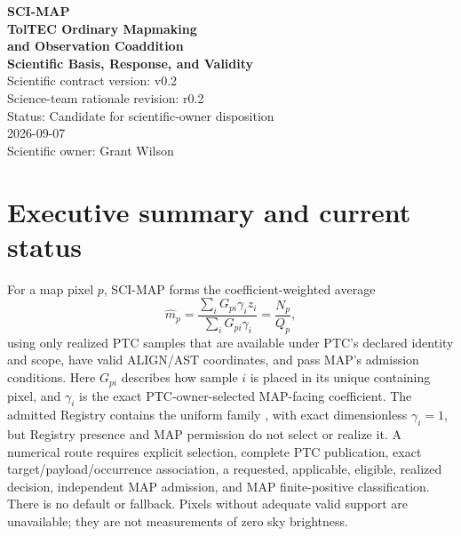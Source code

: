 \documentclass[10pt]{article}
\begin{document}
\hypersetup{pageanchor=false}
\begin{titlepage}
\centering\vspace*{0.48in}
{\Large\color{MapBlue}\textbf{SCI-MAP}}\\[0.18in]
{\huge\color{MapNavy}\textbf{TolTEC Ordinary Mapmaking}}\\[0.08in]
{\LARGE\color{MapNavy}\textbf{and Observation Coaddition}}\\[0.10in]
{\Large\color{MapBlue}\textbf{Scientific Basis, Response, and Validity}}\\[0.38in]
{\large Scientific contract version: v0.2}\\[0.06in]
{\large Science-team rationale revision: r0.2}\\[0.06in]
{\large Status: Candidate for scientific-owner disposition}\\[0.08in]
{\large 2026-09-07}\\[0.42in]

\vfill {\large Scientific owner: Grant Wilson}
\end{titlepage}
\hypersetup{pageanchor=true}

\section*{Executive summary and current status}
For a map pixel \(p\), SCI-MAP forms the coefficient-weighted average
\begin{equation}
 \widehat m_p=\frac{\sum_iG_{pi}\gamma_i z_i}
                         {\sum_iG_{pi}\gamma_i}
 =\frac{N_p}{Q_p},
 \label{eq:map}
\end{equation}
using only realized PTC samples that are available under PTC's declared
identity and scope, have valid ALIGN/AST coordinates, and pass MAP's admission
conditions. Here \(G_{pi}\) describes how
sample \(i\) is placed in its unique containing pixel, and \(\gamma_i\) is the
exact PTC-owner-selected MAP-facing coefficient. The admitted Registry contains
the uniform family \SCIMapPTCUniformFamily{}, with exact dimensionless
\(\gamma_i=1\), but Registry presence and MAP permission do not select or
realize it. A numerical route requires explicit selection, complete PTC
publication, exact target/payload/occurrence association, a requested,
applicable, eligible, realized \SCIMapPTCUniformHandoffProfile{} decision,
independent MAP admission, and MAP finite-positive classification. There is no
default or fallback. Pixels without adequate valid support are unavailable;
they are not measurements of zero sky brightness.
\end{document}
